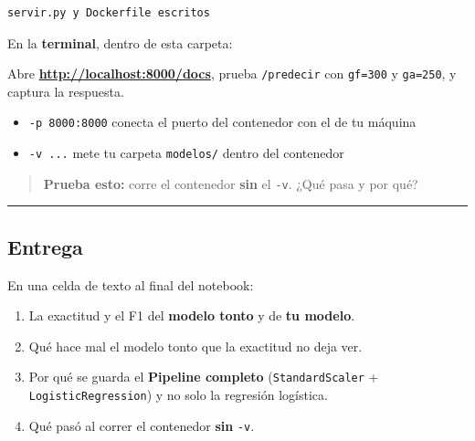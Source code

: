 \documentclass[
]{article}
\newenvironment{Shaded}{}{}
\newcommand{\AttributeTok}[1]{\textcolor[rgb]{0.49,0.56,0.16}{#1}}
\newcommand{\ExtensionTok}[1]{#1}
\newcommand{\NormalTok}[1]{#1}
\newcommand{\StringTok}[1]{\textcolor[rgb]{0.25,0.44,0.63}{#1}}
\newcommand{\VariableTok}[1]{\textcolor[rgb]{0.10,0.09,0.49}{#1}}
\providecommand{\tightlist}{%
  \setlength{\itemsep}{0pt}\setlength{\parskip}{0pt}}
\begin{document}
\begin{verbatim}
servir.py y Dockerfile escritos
\end{verbatim}

\protect{}\label{bKJlMefZnYya}
En la \textbf{terminal}, dentro de esta carpeta:

\begin{Shaded}
\end{Shaded}

Abre \textbf{\url{http://localhost:8000/docs}}, prueba
\texttt{/predecir} con \texttt{gf=300} y \texttt{ga=250}, y captura la
respuesta.

\begin{itemize}
\tightlist
\item
  \texttt{-p\ 8000:8000} conecta el puerto del contenedor con el de tu
  máquina
\item
  \texttt{-v\ ...} mete tu carpeta \texttt{modelos/} dentro del
  contenedor
\end{itemize}

\begin{quote}
\textbf{Prueba esto:} corre el contenedor \textbf{sin} el \texttt{-v}.
¿Qué pasa y por qué?
\end{quote}

\protect{}\label{p99-bvZLnYyb}
\begin{center}\rule{0.5\linewidth}{0.5pt}\end{center}

\subsection{Entrega}\label{entrega}

En una celda de texto al final del notebook:

\begin{enumerate}
\tightlist
\item
  La exactitud y el F1 del \textbf{modelo tonto} y de \textbf{tu
  modelo}.
\item
  Qué hace mal el modelo tonto que la exactitud no deja ver.
\item
  Por qué se guarda el \textbf{Pipeline completo}
  (\texttt{StandardScaler} + \texttt{LogisticRegression}) y no solo la
  regresión logística.
\item
  Qué pasó al correr el contenedor \textbf{sin} \texttt{-v}.
\end{enumerate}
\end{document}
